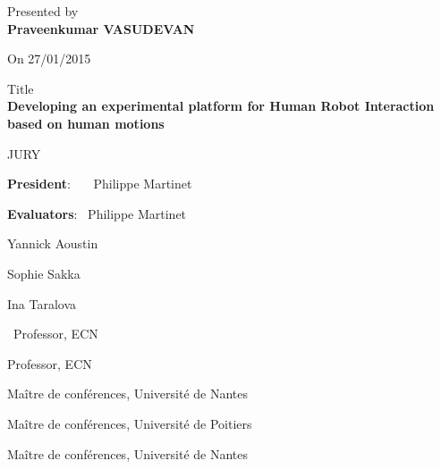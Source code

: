 \documentclass[11pt, openright]{Thesis} %
\begin{document}
\begin{titlepage}
\begin{center}
	\normalsize Presented by\\
	\vspace{0.1in}
	{\large \textbf{Praveenkumar VASUDEVAN}}
	\par
	\vspace{0.1in}
	On 27/01/2015
	\par
	\vspace{0.3in}
	\large Title\\
	\vspace{0.1in}
	\large \textbf{Developing an experimental platform for Human Robot Interaction based on human motions}
	\par
	\vspace{0.4in}
	\normalsize JURY %
	\end{center}
	\par
	\vspace{0.2in}
	\noindent \begin{minipage}{0.5\textwidth}
	\begin{flushleft} 
	\textbf{President}: \  \  \ Philippe Martinet
	\par
	\vspace{0.2in}	
	\textbf{Evaluators}: \ Philippe Martinet
	\par
	\hspace{20mm} Yannick Aoustin
	\par
	\hspace{20mm} Sophie Sakka
	\par
	\hspace{20mm} Ina Taralova
	\par
	\end{flushleft}
	\end{minipage}
	\begin{minipage}{0.55\textwidth}
	\begin{flushleft} 
	\
	Professor, ECN
	\par
	\vspace{0.2in}	
	Professor, ECN
	\par
	Ma\^{i}tre de conf\'{e}rences, Universit\'{e} de Nantes
	\par
	Ma\^{i}tre de conf\'{e}rences, Universit\'{e} de Poitiers	
	\par
	Ma\^{i}tre de conf\'{e}rences, Universit\'{e} de Nantes
	\end{flushleft}
	\end{minipage}
	\\
	\par
	\vspace{0.1in}	

\end{titlepage}
\end{document}
